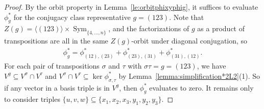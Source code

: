 \documentclass[10pt,a4paper]{amsart}
\numberwithin{equation}{section}
\DeclareMathOperator{\Sym}{Sym}
\begin{document}
\begin{proof}
By the orbit property in Lemma~\ref{le:orbitphixyphig}, it suffices to evaluate $\phi^*_g$ for the conjugacy
class representative $g=(123)$. Note that $Z(g)=\langle(123)\rangle\times \Sym_{\{4,\dots,n\}}$,
and the factorizations of $g$ as a product of transpositions are all in the same $Z(g)$-orbit
under diagonal conjugation, so
\begin{gather*}
\phi_g^{*}=\phi_{(12),(23)}^{*}+\phi_{(23),(31)}^{*}+\phi_{(31),(12)}^{*}.
\end{gather*}
For each pair of transpositions $\sigma$ and $\tau$ with $\sigma\tau=g=(123)$,
we have $V^g \subseteq V^\sigma \cap V^\tau$ and
$V^\sigma \cap V^\tau \subseteq \ker \phi^*_{\sigma,\tau}$
by Lemma~\ref{lemma:simplification*2L2}(1). So if any vector in a basis triple is in $V^g$, then $\phi^*_g$
evaluates to zero. It remains only to consider triples
$\{u,v,w\} \subseteq \{x_1,x_2,x_3,y_1,y_2,y_3\}$.


\end{proof}
\end{document}
